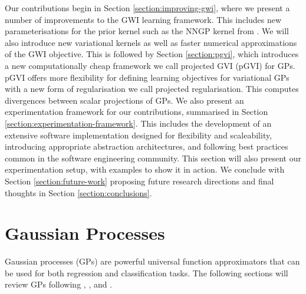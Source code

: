 \documentclass{article}
\numberwithin{equation}{section}
\begin{document}
Our contributions begin in Section \ref{section:improving-gwi}, where we present a number of improvements to the GWI learning framework.
This includes new parameterisations for the prior kernel such as the NNGP kernel from \cite{novak2019neural}.
We will also introduce new variational kernels as well as faster numerical approximations of the GWI objective.
This is followed by Section \ref{section:pgvi}, which introduces a new computationally cheap framework we call projected GVI 
(pGVI) for GPs.
pGVI offers more flexibility for defining learning objectives for variational GPs with a new form of regularisation we call projected regularisation.
This computes divergences between scalar projections of GPs.
We also present an experimentation framework for our contributions, summarised in Section \ref{section:experimentation-framework}. 
This includes the development of an extensive software implementation designed for flexibility and scaleability, introducing appropriate abstraction architectures, and following best practices common in the software engineering community. 
This section will also present our experimentation setup, with examples to show it in action. We conclude with Section \ref{section:future-work} proposing future research directions and final thoughts in Section \ref{section:conclusions}.

\newpage
\section{Gaussian Processes}\label{section:gaussian-processes}
Gaussian processes (GPs) are powerful universal function approximators that can be used for both regression and classification tasks. The following sections will review GPs following \cite{rasmussen2003gaussian}, \cite{matthews2017scalable}, and \cite{wild2022generalized}.
\end{document}
